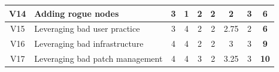 \begin{landscape}
\begin{table}[]
{\begin{tabular}{|c|l|cccc|cc|c|}
V14             & Adding rogue nodes                                                                     & 3                                        & 1                              & 2                                        & 2                    & 2                                      & 3            & \textbf{6}           \\ \hline
V15             & Leveraging bad user practice                                                           & 3                                        & 4                              & 2                                        & 2                    & 2.75                                   & 2            & \textbf{6}           \\ \hline
V16             & Leveraging bad infrastructure                                                          & 4                                        & 4                              & 2                                        & 2                    & 3                                      & 3            & \textbf{9}           \\ \hline
V17             & Leveraging bad patch management                                                        & 4                                        & 4                              & 3                                        & 2                    & 3.25                                   & 3            & \textbf{10}          \\ \hline
\end{tabular}%
}
\end{table}
\end{landscape}

